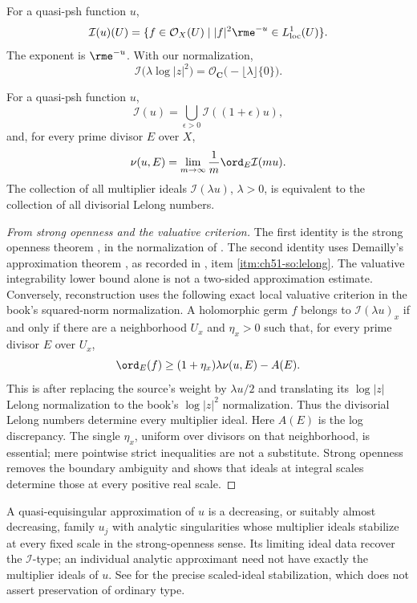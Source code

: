 For a quasi-psh function \(u\),
\[
 \mathcal I(u)(U)
 =\{f\in\mathcal O_X(U)\mid |f|^2\rme^{-u}
                       \in L^1_{\mathrm{loc}}(U)\}.
\]
The exponent is \(\rme^{-u}\). With our normalization,
\[
 \mathcal I\bigl(\lambda\log|z|^2\bigr)
 =\mathcal O_{\mathbf C}
   \bigl(-\lfloor\lambda\rfloor\{0\}\bigr).
\]

\begin{theorem}\label{thm:appH-strong-openness}
For a quasi-psh function \(u\),
\[
 \mathcal I(u)=\bigcup_{\epsilon>0}\mathcal I((1+\epsilon)u),
\]
and, for every prime divisor \(E\) over \(X\),
\[
 \nu(u,E)
 =\lim_{m\to\infty}\frac1m
                   \ord_E\mathcal I(m u).
\]
The collection of all multiplier ideals
\(\mathcal I(\lambda u)\), \(\lambda>0\), is equivalent to the collection
of all divisorial Lelong numbers.
\end{theorem}

\begin{proof}[From strong openness and the valuative criterion]
The first identity is the strong openness theorem
\cite[Theorem~1.1]{GZ15}, in the normalization of
.  The second identity uses Demailly's approximation theorem
\cite{Dem92reg}, as recorded in ,
item \cref{itm:ch51-so:lelong}.  The valuative integrability lower bound
alone is not a two-sided approximation estimate.  Conversely, reconstruction
uses the following exact local valuative
criterion in the book's squared-norm normalization.  A holomorphic germ
\(f\) belongs to \(\mathcal I(\lambda u)_x\) if and only if there are a
neighborhood \(U_x\) and \(\eta_x>0\) such that, for every prime divisor
\(E\) over \(U_x\),
\[
 \ord_E(f)\geq(1+\eta_x)\lambda\nu(u,E)-A(E).
\]
This is \cite[Corollary~10.18]{Bou17} after replacing the source's weight by
\(\lambda u/2\) and translating its \(\log|z|\) Lelong normalization to
the book's \(\log|z|^2\) normalization.  Thus the divisorial Lelong numbers determine every multiplier
ideal.  Here \(A(E)\) is the log discrepancy.  The single \(\eta_x\),
uniform over divisors on that neighborhood, is essential; mere
pointwise strict inequalities are not a substitute.  Strong openness
removes the boundary ambiguity and shows that ideals at integral scales
determine those at every positive real scale.
\end{proof}

A quasi-equisingular approximation of \(u\) is a decreasing, or suitably
almost decreasing, family \(u_j\) with analytic singularities whose
multiplier ideals stabilize at every fixed scale in the strong-openness
sense.  Its limiting ideal data recover the \(\mathcal I\)-type;
an individual analytic approximant need not have exactly the multiplier
ideals of \(u\).  See  for the precise
scaled-ideal stabilization, which does not assert preservation of ordinary
type.

